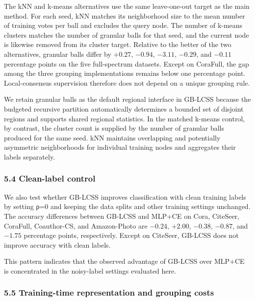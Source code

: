 The kNN and k-means alternatives use the same leave-one-out target as the main method. For each seed, kNN matches its neighborhood size to the mean number of training votes per ball and excludes the query node. The number of k-means clusters matches the number of granular balls for that seed, and the current node is likewise removed from its cluster target. Relative to the better of the two alternatives, granular balls differ by \(+ 0.27\), \(- 0.94\), \(- 3.11\), \(- 0.29\), and \(- 0.11\) percentage points on the five full-spectrum datasets. Except on CoraFull, the gap among the three grouping implementations remains below one percentage point. Local-consensus supervision therefore does not depend on a unique grouping rule.

We retain granular balls as the default regional interface in GB-LCSS because the budgeted recursive partition automatically determines a bounded set of disjoint regions and supports shared regional statistics. In the matched k-means control, by contrast, the cluster count is supplied by the number of granular balls produced for the same seed. kNN maintains overlapping and potentially asymmetric neighborhoods for individual training nodes and aggregates their labels separately.

\subsubsection{5.4 Clean-label control}\label{clean-label-control}

We also test whether GB-LCSS improves classification with clean training labels by setting ρ=0 and keeping the data splits and other training settings unchanged. The accuracy differences between GB-LCSS and MLP+CE on Cora, CiteSeer, CoraFull, Coauthor-CS, and Amazon-Photo are \(- 0.24\), \(+ 2.00\), \(- 0.38\), \(- 0.87\), and \(- 1.75\) percentage points, respectively. Except on CiteSeer, GB-LCSS does not improve accuracy with clean labels.

This pattern indicates that the observed advantage of GB-LCSS over MLP+CE is concentrated in the noisy-label settings evaluated here.

\subsubsection{5.5 Training-time representation and grouping costs}\label{training-time-representation-and-grouping-costs}

